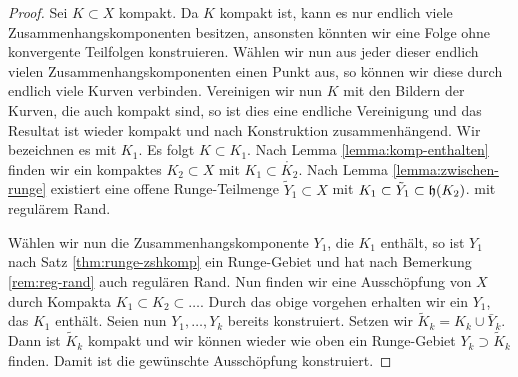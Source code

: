 \begin{proof}
  Sei $K \subset X$ kompakt. Da $K$ kompakt ist, kann es nur endlich
  viele Zusammenhangskomponenten besitzen, ansonsten könnten wir eine
  Folge ohne konvergente Teilfolgen konstruieren. Wählen wir nun aus
  jeder dieser endlich vielen Zusammenhangskomponenten einen Punkt
  aus, so können wir diese durch endlich viele Kurven
  verbinden. Vereinigen wir nun $K$ mit den Bildern der Kurven, die
  auch kompakt sind, so ist dies eine endliche Vereinigung und das
  Resultat ist wieder kompakt und nach Konstruktion
  zusammenhängend. Wir bezeichnen es mit $K_1$. Es folgt $K \subset
  K_1$. Nach Lemma \ref{lemma:komp-enthalten} finden wir ein kompaktes $K_2
  \subset X$ mit $K_1 \subset \mathring{K_2}$. Nach Lemma
  \ref{lemma:zwischen-runge}
  existiert eine offene Runge-Teilmenge $\tilde Y_1 \subset X$ mit
  $K_1 \subset \tilde Y_1 \subset \mathfrak{h}(K_2)$. mit regulärem Rand.
  
  Wählen wir nun die Zusammenhangskomponente $Y_1$, die $K_1$ enthält,
  so ist $Y_1$ nach Satz \ref{thm:runge-zshkomp} ein Runge-Gebiet
  und hat nach Bemerkung \ref{rem:reg-rand} auch regulären Rand.
  Nun finden wir eine Ausschöpfung von $X$ durch Kompakta $K_1 \subset
  K_2 \subset \dots$. 
  Durch das obige vorgehen erhalten wir ein $Y_1$, das $K_1$
  enthält.
  Seien nun $Y_1, \dots, Y_k$ bereits konstruiert. Setzen wir $\tilde
  K_k = K_k \cup \bar Y_k$. Dann ist $\tilde K_k$ kompakt und wir
  können wieder wie oben ein Runge-Gebiet $Y_k \supset \tilde K_k$
  finden. Damit ist die gewünschte Ausschöpfung konstruiert.
\end{proof}

